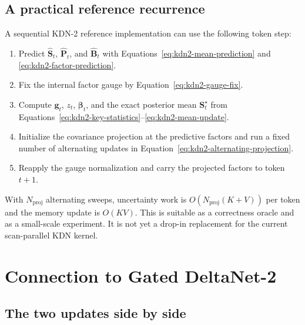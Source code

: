 \documentclass[11pt]{article}
\newcommand{\ve}[1]{\boldsymbol{#1}}
\begin{document}
\subsection{A practical reference recurrence}

A sequential KDN-2 reference implementation can use the following token step:
\begin{enumerate}
  \item Predict $\widehat{\ve{S}}_t$, $\widehat{\ve{P}}_t$, and
    $\widehat{\ve{B}}_t$ with Equations~\eqref{eq:kdn2-mean-prediction} and
    \eqref{eq:kdn2-factor-prediction}.
  \item Fix the internal factor gauge by Equation~\eqref{eq:kdn2-gauge-fix}.
  \item Compute $\ve{g}_t$, $z_t$, $\ve{\beta}_t$, and the exact posterior mean
    $\ve{S}_t^{\star}$ from Equations~\eqref{eq:kdn2-key-statistics}--\eqref{eq:kdn2-mean-update}.
  \item Initialize the covariance projection at the predictive factors and run a fixed number of
    alternating updates in Equation~\eqref{eq:kdn2-alternating-projection}.
  \item Reapply the gauge normalization and carry the projected factors to token $t+1$.
\end{enumerate}
With $N_{\mathrm{proj}}$ alternating sweeps, uncertainty work is
$O(N_{\mathrm{proj}}(K+V))$ per token and the memory update is $O(KV)$.  This is suitable as a
correctness oracle and as a small-scale experiment.  It is not yet a drop-in replacement for the
current scan-parallel KDN kernel.

\section{Connection to Gated DeltaNet-2}
\label{sec:gdn2-connection}

\subsection{The two updates side by side}
\end{document}
